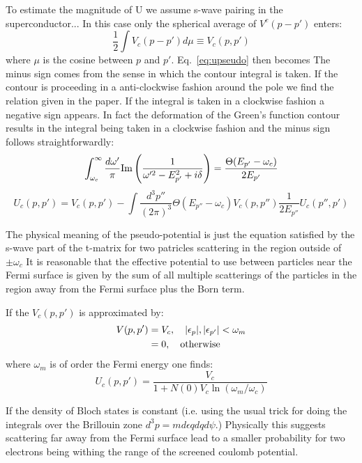 \documentclass{article}
\begin{document}
To estimate the magnitude of U we assume s-wave pairing in the superconductor...
In this case only the spherical average of $V^{c}(p-p')$ enters:
%
\begin{equation}
\frac{1}{2}\int V_{c}(p-p') d\mu \equiv V_{c}(p,p')
\end{equation}
%
where $\mu$ is the cosine between $p$ and $p'$. Eq.~\ref{eq:upseudo} then becomes 
{\color{blue} The minus sign comes from the sense in which the contour integral
is taken. If the contour is proceeding in a anti-clockwise fashion around the pole
we find the relation given in the paper. If the integral is taken in a clockwise 
fashion a negative sign appears. In fact the deformation of the Green's function contour 
results in the integral being taken in a clockwise fashion and the minus sign follows
straightforwardly}:
%
\begin{equation}
\int_{\omega_{c}}^{\infty}\frac{d\omega'}{\pi} {\rm Im} \left(\frac{1}{\omega'^{2} - E^{2}_{p'} + i\delta} \right)= \frac{\Theta(E_{p'} - \omega_{c})}{2E_{p'}} 
\end{equation}
%
\begin{equation}
U_{c}(p,p') = V_{c}(p,p') - \int \frac{d^{3}p''}{(2\pi)^{3}} \Theta(E_{p''} - \omega_{c})V_{c}(p,p'') \frac{1}{2E_{p''}}U_{c}(p'',p')
\end{equation}
%

The physical meaning of the pseudo-potential  is just the equation satisfied by the s-wave part 
of the t-matrix for two patricles scattering in the region outside of $\pm \omega_c$ It is reasonable that
the effective potential to use between particles near
the Fermi surface is given by the sum of all multiple scatterings of 
the particles in the region away from the Fermi surface plus the Born term.

If the $V_{c}(p,p')$ is approximated by:
%
\begin{align}
V(p,p') & =  V_{c}, \quad |\epsilon_{p}|, |\epsilon_{p'}| < \omega_{m} \nonumber \\
        & =  0, \quad {\rm otherwise}
\end{align}
%
where $\omega_{m}$ is of order the Fermi energy one finds:
%
\begin{equation}
U_{c}(p,p') = \frac{V_{c}}{1+N(0)V_{c}\ln(\omega_{m}/\omega_{c})}
\end{equation}
%

If the density of Bloch states is constant (i.e. using the usual trick for doing the integrals over 
the Brillouin zone $d^{3}p = m d\epsilon qdq d\psi$.) Physically this suggests scattering far
away from the Fermi surface lead to a smaller probability for two electrons being withing the range of the 
screened coulomb potential.
\end{document}
